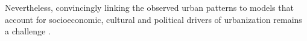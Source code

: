 \documentclass[10pt,letterpaper]{article}
\begin{document}
Nevertheless, convincingly linking the observed urban patterns to models that account for socioeconomic, cultural and political drivers of urbanization remains a challenge \cite{batty2001modelling, manson2006complexity}. %
\end{document}
